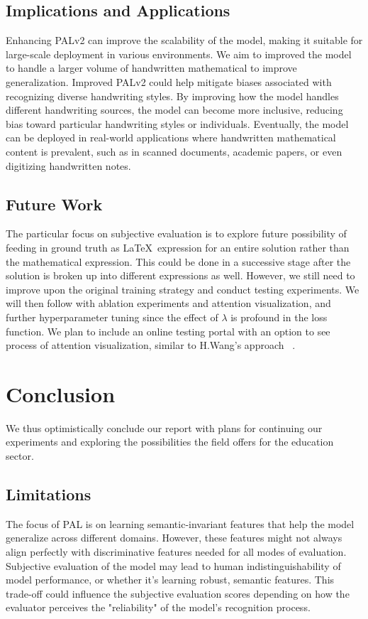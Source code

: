\documentclass[9pt,a4paper,twoside]{rho-class/rho}
\begin{document}
\subsection{Implications and Applications}
Enhancing PALv2 can improve the scalability of the model, making it suitable for large-scale deployment in various environments. We aim to improved the model to handle a larger volume of handwritten mathematical to improve generalization. Improved PALv2 could help mitigate biases associated with recognizing diverse handwriting styles. By improving how the model handles different handwriting sources, the model can become more inclusive, reducing bias toward particular handwriting styles or individuals.
Eventually, the model can be deployed in real-world applications where handwritten mathematical content is prevalent, such as in scanned documents, academic papers, or even digitizing handwritten notes. 

\subsection{Future Work}
The particular focus on subjective evaluation is to explore future possibility of feeding in ground truth as \LaTeX\ expression for an entire solution rather than the mathematical expression. This could be done in a successive stage after the solution is broken up into different expressions as well. 
However, we still need to improve upon the original training strategy and conduct testing experiments. We will then follow with ablation experiments and attention visualization, and further hyperparameter tuning since the effect of $\lambda$ is profound in the loss function. We plan to include an online testing portal with an option to see process of attention visualization, similar to H.Wang's approach ~\cite{hwang}. 

\section{Conclusion}
We thus optimistically conclude our report with plans for continuing our experiments and exploring the possibilities the field offers for the education sector.

\subsection{Limitations}
The focus of PAL is on learning semantic-invariant features that help the model generalize across different domains. However, these features might not always align perfectly with discriminative features needed for all modes of evaluation.
Subjective evaluation of the model may lead to human indistinguishability of model performance, or whether it's learning robust, semantic features. This trade-off could influence the subjective evaluation scores depending on how the evaluator perceives the "reliability" of the model’s recognition process.
\end{document}
